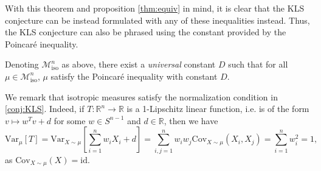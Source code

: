 With this theorem and proposition \ref{thm:equiv} in mind, it is clear that the KLS conjecture can be 
instead formulated with any of these inequalities instead. Thus, the KLS conjecture can also be phrased 
using the constant provided by the Poincaré inequality. 

\begin{conjecture}
  Denoting \(\mathscr{M}^n_{\text{iso}}\) as above, there exist a \textit{universal} constant \(D\) 
  such that for all \(\mu \in \mathscr{M}^n_{\text{iso}}\), \(\mu\) satisfy the Poincaré inequality 
  with constant \(D\).
\end{conjecture}

We remark that isotropic measures satisfy the normalization condition in \ref{conj:KLS}. Indeed, if 
\(T : \mathbb{R}^n \to \mathbb{R}\) is a 1-Lipschitz linear function, i.e. is of the form \(v \mapsto w^T v + d\) 
for some \(w \in S^{n - 1}\) and \(d \in \mathbb{R}\), then we have
\[\text{Var}_{\mu}[T] = \text{Var}_{X \sim \mu}\left[\sum_{i = 1}^n w_i X_i + d\right] 
    = \sum_{i, j = 1}^n w_i w_j \text{Cov}_{X \sim \mu}(X_i, X_j) = \sum_{i = 1}^n w_i^2 = 1,\]
as \(\text{Cov}_{X \sim \mu}(X) = \text{id}\).

